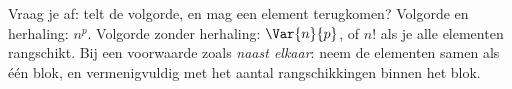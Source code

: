\begin{werkwijze}
Vraag je af: telt de volgorde, en mag een element terugkomen? Volgorde en herhaling: $n^p$. Volgorde zonder herhaling: $\Var{n}{p}$, of $n!$ als je alle elementen rangschikt. Bij een voorwaarde zoals \textit{naast elkaar}: neem de elementen samen als één blok, en vermenigvuldig met het aantal rangschikkingen binnen het blok.
\end{werkwijze}


\begin{oefeningen}


\end{oefeningen}

\opdrachtenkop

\begin{oefeningen}



























\end{oefeningen}

